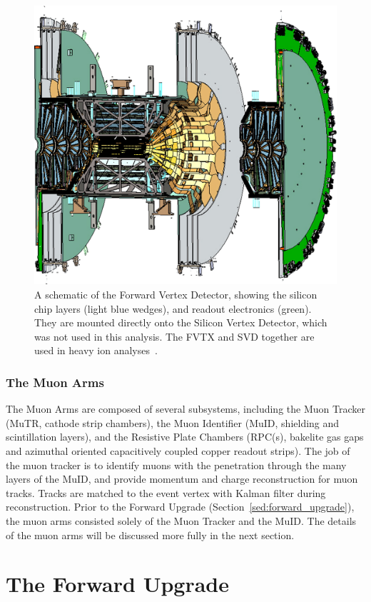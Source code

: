 \begin{figure}[ht]
  \centering
  \includegraphics[width=0.6\linewidth]{./figures/forward_vertex_detector}
  \caption{
    A schematic of the Forward Vertex Detector, showing the silicon chip layers
    (light blue wedges), and readout electronics (green). They are mounted
    directly onto the Silicon Vertex Detector, which was not used in this
    analysis. The FVTX and SVD together are used in heavy ion
    analyses~\cite{Aidala2014}.
  }
  \label{fig:forward_vertex_detector}
\end{figure}

\subsubsection{The Muon Arms}

The Muon Arms are composed of several subsystems, including the Muon Tracker
(MuTR, cathode strip chambers), the Muon Identifier (MuID, shielding and
scintillation layers), and the Resistive Plate Chambers (RPC(s), bakelite gas
gaps and azimuthal oriented capacitively coupled copper readout strips). The job
of the muon tracker is to identify muons with the penetration through the many
layers of the MuID, and provide momentum and charge reconstruction for muon
tracks. Tracks are matched to the event vertex with Kalman filter during
reconstruction. Prior to the Forward Upgrade
(Section~\ref{sed:forward_upgrade}), the muon arms consisted solely of the Muon
Tracker and the MuID. The details of the muon arms will be discussed more fully
in the next section.


\clearpage
\section{The Forward Upgrade} 
\label{sec:forward_upgrade}

